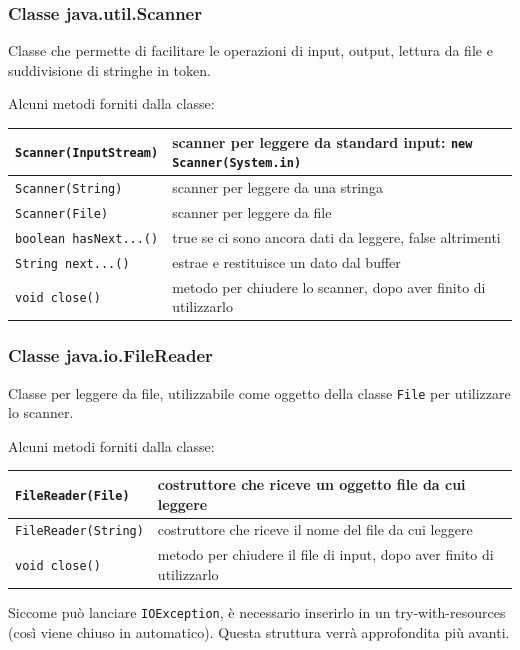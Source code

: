 \documentclass[a4paper]{article}
\begin{document}
\subsubsection*{Classe java.util.Scanner}
Classe che permette di facilitare le operazioni di input, output, lettura da file e suddivisione di stringhe in token.

Alcuni metodi forniti dalla classe:
\begin{center}
	\begin{tabularx}{\textwidth}{l X}
		\toprule
		\verb|Scanner(InputStream)| & scanner per leggere da standard input: \verb|new Scanner(System.in)| \\
		\midrule
		\verb|Scanner(String)| & scanner per leggere da una stringa \\
		\midrule
		\verb|Scanner(File)| & scanner per leggere da file \\
		\midrule
		\verb|boolean hasNext...()| & true se ci sono ancora dati da leggere, false altrimenti \\
		\midrule
		\verb|String next...()| & estrae e restituisce un dato dal buffer \\
		\midrule
		\verb|void close()| & metodo per chiudere lo scanner, dopo aver finito di utilizzarlo \\
		\bottomrule
	\end{tabularx}
\end{center}

\subsubsection*{Classe java.io.FileReader}
Classe per leggere da file, utilizzabile come oggetto della classe \verb|File| per utilizzare lo scanner.

Alcuni metodi forniti dalla classe:
\begin{center}
	\begin{tabularx}{\textwidth}{l X}
		\toprule
		\verb|FileReader(File)| & costruttore che riceve un oggetto file da cui leggere \\
		\midrule
		\verb|FileReader(String)| & costruttore che riceve il nome del file da cui leggere \\
		\midrule
		\verb|void close()| & metodo per chiudere il file di input, dopo aver finito di utilizzarlo \\
		\bottomrule
	\end{tabularx}
\end{center}

Siccome può lanciare \verb|IOException|, è necessario inserirlo in un try-with-resources (così viene chiuso in automatico).
Questa struttura verrà approfondita più avanti.
\end{document}
